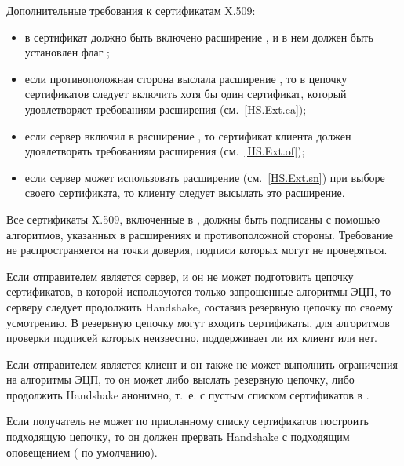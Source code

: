 Дополнительные требования к сертификатам X.509:
%
\begin{itemize}
\item
в сертификат должно быть включено расширение , и в нем должен 
быть установлен флаг ; 

\item
если противоположная сторона выслала расширение 
, то в цепочку сертификатов 
 следует включить хотя бы один сертификат, который 
удовлетворяет требованиям расширения (см.~\ref{HS.Ext.ca});

\item
если сервер включил в  расширение 
, то сертификат клиента должен удовлетворять 
требованиям расширения (см.~\ref{HS.Ext.of});

\item
если сервер может использовать расширение  
(см.~\ref{HS.Ext.sn}) при выборе своего сертификата, то клиенту следует 
высылать это расширение.
\end{itemize}


Все сертификаты X.509, включенные в , должны быть 
подписаны с помощью алгоритмов, указанных в расширениях 
 и 
 противоположной стороны. 
%
Требование не распространяется на точки доверия, подписи которых могут не 
проверяться.

Если отправителем  является сервер, и он не может 
подготовить цепочку сертификатов, в которой используются только запрошенные 
алгоритмы ЭЦП, то серверу следует продолжить Handshake, составив резервную 
цепочку по своему усмотрению.
%
В резервную цепочку могут входить сертификаты, для алгоритмов проверки подписей 
которых неизвестно, поддерживает ли их клиент или нет.

Если отправителем  является клиент и он также не 
может выполнить ограничения на алгоритмы ЭЦП, то он может либо выслать 
резервную цепочку, либо продолжить Handshake анонимно, т.~е. с пустым списком 
сертификатов в .

Если получатель  не может по присланному списку 
сертификатов построить подходящую цепочку, то он должен прервать Handshake
с подходящим оповещением ( по умолчанию).

